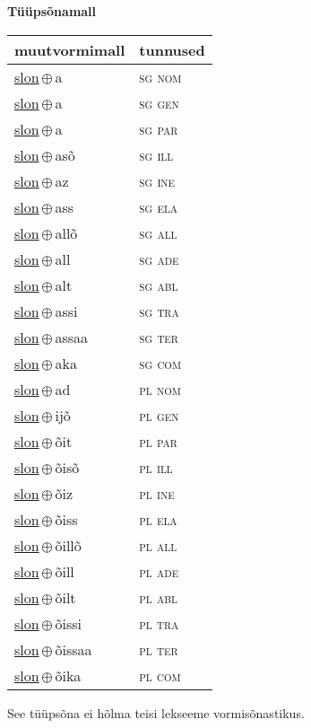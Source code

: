 

\vspace{3.5em}
\noindent \begin{minipage}{\textwidth}
\noindent \textbf{Tüüpsõnamall \,}\\

\begin{sideways}
\begin{tabular}{l l}
muutvormimall & tunnused \\
\hline
\underline{slon}\,$\oplus$\,a & \textsc{ sg nom } \\
\underline{slon}\,$\oplus$\,a & \textsc{ sg gen } \\
\underline{slon}\,$\oplus$\,a & \textsc{ sg par } \\
\underline{slon}\,$\oplus$\,asõ & \textsc{ sg ill } \\
\underline{slon}\,$\oplus$\,az & \textsc{ sg ine } \\
\underline{slon}\,$\oplus$\,ass & \textsc{ sg ela } \\
\underline{slon}\,$\oplus$\,allõ & \textsc{ sg all } \\
\underline{slon}\,$\oplus$\,all & \textsc{ sg ade } \\
\underline{slon}\,$\oplus$\,alt & \textsc{ sg abl } \\
\underline{slon}\,$\oplus$\,assi & \textsc{ sg tra } \\
\underline{slon}\,$\oplus$\,assaa & \textsc{ sg ter } \\
\underline{slon}\,$\oplus$\,aka & \textsc{ sg com } \\
\underline{slon}\,$\oplus$\,ad & \textsc{ pl nom } \\
\underline{slon}\,$\oplus$\,ijõ & \textsc{ pl gen } \\
\underline{slon}\,$\oplus$\,õit & \textsc{ pl par } \\
\underline{slon}\,$\oplus$\,õisõ & \textsc{ pl ill } \\
\underline{slon}\,$\oplus$\,õiz & \textsc{ pl ine } \\
\underline{slon}\,$\oplus$\,õiss & \textsc{ pl ela } \\
\underline{slon}\,$\oplus$\,õillõ & \textsc{ pl all } \\
\underline{slon}\,$\oplus$\,õill & \textsc{ pl ade } \\
\underline{slon}\,$\oplus$\,õilt & \textsc{ pl abl } \\
\underline{slon}\,$\oplus$\,õissi & \textsc{ pl tra } \\
\underline{slon}\,$\oplus$\,õissaa & \textsc{ pl ter } \\
\underline{slon}\,$\oplus$\,õika & \textsc{ pl com } \\
\end{tabular}
\end{sideways}
\label{tab:tüüpsõnamall-slona}

\end{minipage}

 
\vspace{1em}
\noindent See tüüpsõna ei hõlma teisi lekseeme vormi\-sõnastikus.
